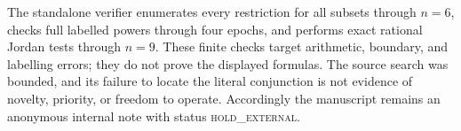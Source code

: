 \documentclass[a4paper,10pt]{amsart}
\theoremstyle{remark}
\begin{document}
The standalone verifier enumerates every restriction for all subsets through
$n=6$, checks full labelled powers through four epochs, and performs exact
rational Jordan tests through $n=9$.  These finite checks target arithmetic,
boundary, and labelling errors; they do not prove the displayed formulas.
The source search was bounded, and its failure to locate the literal
conjunction is not evidence of novelty, priority, or freedom to operate.
Accordingly the manuscript remains an anonymous internal note with status
\textsc{hold\_external}.



\end{document}
